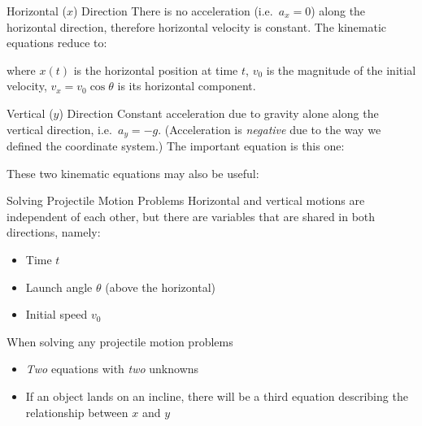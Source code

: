 \documentclass[12pt,compress,aspectratio=169,dvipsnames]{beamer}
\begin{document}
\begin{frame}{Horizontal ($x$) Direction}
  There is no acceleration (i.e.\ $a_x=0$) along the horizontal direction,
  therefore horizontal velocity is constant. The kinematic equations reduce to:


  where $x(t)$ is the horizontal position at time $t$, $v_0$ is the
  magnitude of the initial velocity, $v_x=v_0\cos\theta$ is its horizontal
  component.
\end{frame}




\begin{frame}{Vertical ($y$) Direction}
  Constant acceleration due to gravity alone along the vertical direction, i.e.\
  $a_y=-g$. (Acceleration is \emph{negative} due to the way we defined the
  coordinate system.) The important equation is this one:


  These two kinematic equations may also be useful:

  \vspace{-.2in}{\large
    \begin{align*}
      v_y &= \left[v_0\sin\theta\right] -gt\\
      v_y^2&=\left[v_0\sin\theta\right]^2-2gy
    \end{align*}
  }
\end{frame}



\begin{frame}{Solving Projectile Motion Problems}
  Horizontal and vertical motions are independent of each other, but there are
  variables that are shared in both directions, namely:
  \begin{itemize}
  \item Time $t$
  \item Launch angle $\theta$ (above the horizontal)
  \item Initial speed $v_0$
  \end{itemize}
  
  \vspace{.2in}When solving any projectile motion problems
  \begin{itemize}
  \item \emph{Two} equations with \emph{two} unknowns
  \item If an object lands on an incline, there will be a third equation
    describing the relationship between $x$ and $y$
  \end{itemize}
\end{frame}
\end{document}
